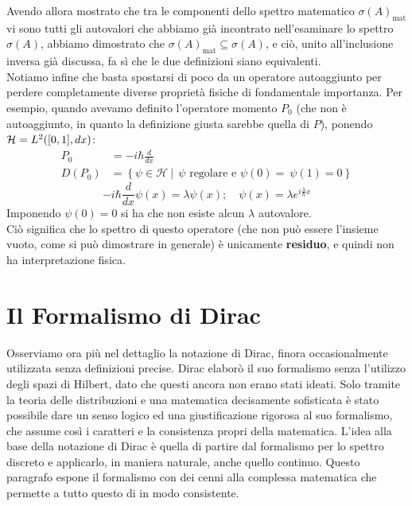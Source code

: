 \documentclass[../../FisicaTeorica.tex]{subfiles}
\begin{document}
Avendo allora mostrato che tra le componenti dello spettro matematico $\sigma(A)_{\text{mat}}$ vi sono tutti gli autovalori che abbiamo già incontrato nell'esaminare lo spettro $\sigma(A)$, abbiamo dimostrato che $\sigma(A)_{\text{mat}} \subseteq \sigma(A)$, e ciò, unito all'inclusione inversa già discussa, fa sì che le due definizioni siano equivalenti.\\
Notiamo infine che basta spostarsi di poco da un operatore autoaggiunto per perdere completamente diverse proprietà fisiche di fondamentale importanza. Per esempio, quando avevamo definito l'operatore momento $P_0$ (che non è autoaggiunto, in quanto la definizione giusta sarebbe quella di $P$), ponendo $\mathcal{H} = L^2([0,1],dx)$:
\begin{align*}
P_0&=-i\hbar \frac{d}{dx}\\
D\left(P_0\right)&=\left\{\psi\in\mathcal{H}\ |\ \ \psi\text{ regolare e } \psi\left(0\right)=\ \psi\left(1\right)=0\right\}
\end{align*}
\[
-i\hbar \frac{d}{dx}\psi(x) = \lambda \psi(x); \quad \psi(x) = \lambda e^{i\frac{\lambda}{\hbar}x}
\]
Imponendo $\psi \left(0\right)=0$ si ha che non esiste alcun $\lambda$ autovalore.\\ Ciò significa che lo spettro di questo operatore (che non può essere l'insieme vuoto, come si può dimostrare in generale) è unicamente \textbf{residuo}, e quindi non ha interpretazione fisica.









\section{Il Formalismo di Dirac}
Osserviamo ora più nel dettaglio la notazione di Dirac, finora occasionalmente utilizzata senza definizioni precise.
Dirac elaborò il suo formalismo senza l'utilizzo degli spazi di Hilbert, dato che questi ancora non erano stati ideati. Solo tramite la teoria delle distribuzioni e una matematica decisamente sofisticata è stato possibile dare un senso logico ed una giustificazione rigorosa al suo formalismo, che assume così i caratteri e la consistenza propri della matematica. L'idea alla base della notazione di Dirac è quella di partire dal formalismo per lo spettro discreto e applicarlo, in maniera naturale, anche quello continuo. Questo paragrafo espone il formalismo con dei cenni alla complessa matematica che permette a tutto questo di  in modo consistente.\\
\end{document}
